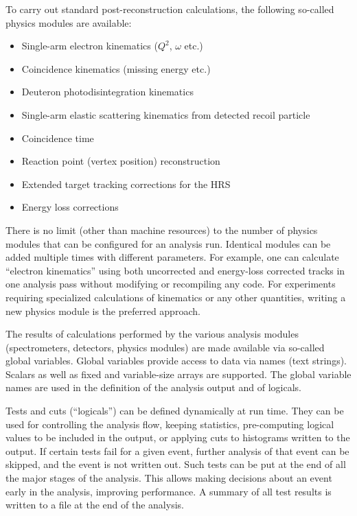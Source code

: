 {{To carry out standard post-reconstruction calculations, the following
so-called physics modules are available:
\begin{itemize} \setlength{\parskip}{0ex}
  \item Single-arm electron kinematics ($Q^2$, $\omega$ etc.)
  \item Coincidence kinematics (missing energy etc.)
  \item Deuteron photodisintegration kinematics
  \item Single-arm elastic scattering kinematics from detected recoil
          particle 
  \item Coincidence time
  \item Reaction point (vertex position) reconstruction 
  \item Extended target tracking corrections for the HRS
  \item Energy loss corrections
\end{itemize}
There is no limit (other than machine resources) to the number of physics 
modules that can be configured for an analysis run.
Identical modules can be added multiple times with different parameters.
For example, one can calculate ``electron kinematics'' using both uncorrected
and energy-loss corrected tracks in one analysis pass without modifying
or recompiling any code. For experiments requiring
specialized calculations of kinematics or any other quantities,
writing a new physics module is the preferred approach. 

The results of calculations performed by the various analysis modules 
(spectrometers, detectors, physics modules) are made available via 
so-called global variables. 
Global variables provide access to data via names (text strings). 
Scalars as well as fixed and variable-size arrays are supported.
The global variable names are used in the definition of the analysis output
and of logicals. 

Tests and cuts (``logicals'') can be defined
dynamically at run time. They can be used for controlling the analysis flow,
keeping statistics, pre-computing logical values to be included in the output,
or applying cuts to histograms written to the output.
If certain tests fail for a given event, further analysis of that
event can be skipped, and the event is not written out.  Such tests
can be put at the end of all the major stages of the analysis.  This
allows making decisions about an event early in the analysis,
improving performance.  A summary of all test results is written to a
file at the end of the analysis.

}}
